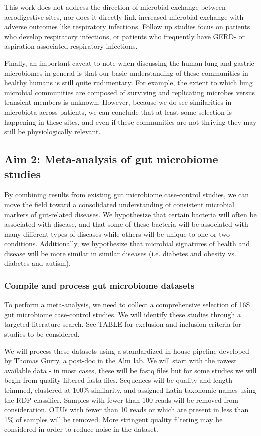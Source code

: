 \documentclass[12pt]{article}
\begin{document}
This work does not address the direction of microbial exchange between 
aerodigestive sites, nor does it directly link increased microbial 
exchange with adverse outcomes like respiratory infections. Follow up 
studies focus on patients who develop respiratory infections, or 
patients who frequently have GERD- or aspiration-associated 
respiratory infections. 


Finally, an important caveat to note when discussing the human lung 
and gastric microbiomes in general is that our basic understanding of 
these communities in healthy humans is still quite rudimentary. For 
example, the extent to which lung microbial communities are composed 
of surviving and replicating microbes versus transient members is 
unknown. However, because we do see similarities in microbiota across 
patients, we can conclude that at least some selection is happening in 
these sites, and even if these communities are not thriving they may 
still be physiologically relevant.

\subsection{Aim 2: Meta-analysis of gut microbiome studies}\label{sec:aim2}
By combining results from existing gut microbiome case-control 
studies, we can move the field toward a consolidated understanding of 
consistent microbial markers of gut-related diseases. We hypothesize 
that certain bacteria will often be associated with disease, and that 
some of these bacteria will be associated with many different types of 
diseases while others will be unique to one or two conditions. 
Additionally, we hypothesize that microbial signatures  of health and 
disease will be more similar in similar diseases (i.e. diabetes and 
obesity vs. diabetes and autism).

\subsubsection{Compile and process gut microbiome datasets}
To perform a meta-analysis, we need to collect a 
comprehensive selection of 16S gut microbiome case-control studies. We 
will identify these studies through a targeted literature search.  See 
TABLE for exclusion and inclusion criteria for studies to be 
considered.

We will process these datasets using a standardized in-house pipeline 
developed by Thomas Gurry, a post-doc in the Alm lab. We will 
start with the rawest available data - in most cases, these will be 
fastq files but for some studies we will begin from quality-filtered 
fasta files. Sequences will be quality and length trimmed, clustered 
at 100\% similarity, and assigned Latin taxonomic names using the RDP 
classifier. Samples with fewer than 100 reads will be removed from 
consideration. OTUs with fewer than 10 reads or which are present in 
less than 1\% of samples will be removed. More stringent quality 
filtering may be considered in order to reduce noise in the dataset.
\end{document}
